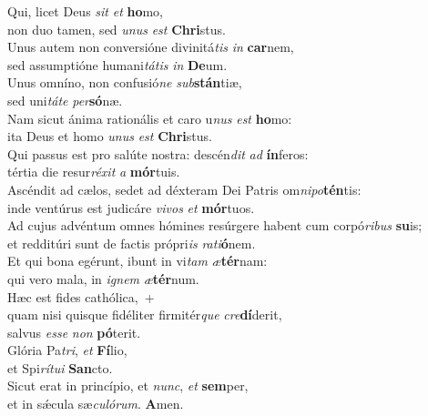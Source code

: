 \evenverse Qui, licet Deus \textit{sit} \textit{et} \textbf{ho}mo,~\*\\
\evenverse non duo tamen, sed \textit{u}\textit{nus} \textit{est} \textbf{Chri}stus.\\
\oddverse Unus autem non conversióne divinitá\textit{tis} \textit{in} \textbf{car}nem,~\*\\
\oddverse sed assumptióne humani\textit{tá}\textit{tis} \textit{in} \textbf{De}um.\\
\evenverse Unus omníno, non confusió\textit{ne} \textit{sub}\textbf{stán}tiæ,~\*\\
\evenverse sed uni\textit{tá}\textit{te} \textit{per}\textbf{só}næ.\\
\oddverse Nam sicut ánima rationális et caro u\textit{nus} \textit{est} \textbf{ho}mo:~\*\\
\oddverse ita Deus et homo \textit{u}\textit{nus} \textit{est} \textbf{Chri}stus.\\
\evenverse Qui passus est pro salúte nostra: descén\textit{dit} \textit{ad} \textbf{ín}feros:~\*\\
\evenverse tértia die resur\textit{ré}\textit{xit} \textit{a} \textbf{mór}tuis.\\
\oddverse Ascéndit ad cælos, sedet ad déxteram Dei Patris om\textit{ni}\textit{po}\textbf{tén}tis:~\*\\
\oddverse inde ventúrus est judicáre \textit{vi}\textit{vos} \textit{et} \textbf{mór}tuos.\\
\evenverse Ad cujus advéntum omnes hómines resúrgere habent cum corpó\textit{ri}\textit{bus} \textbf{su}is;~\*\\
\evenverse et redditúri sunt de factis própri\textit{is} \textit{ra}\textit{ti}\textbf{ó}nem.\\
\oddverse Et qui bona egérunt, ibunt in vi\textit{tam} \textit{æ}\textbf{tér}nam:~\*\\
\oddverse qui vero mala, in \textit{i}\textit{gnem} \textit{æ}\textbf{tér}num.\\
\evenverse Hæc est fides cathólica,~+\\
\evenverse  quam nisi quisque fidéliter firmitér\textit{que} \textit{cre}\textbf{dí}derit,~\*\\
\evenverse salvus \textit{es}\textit{se} \textit{non} \textbf{pó}terit.\\
\oddverse Glória Pa\textit{tri}, \textit{et} \textbf{Fí}lio,~\*\\
\oddverse et Spi\textit{rí}\textit{tu}\textit{i} \textbf{San}cto.\\
\evenverse Sicut erat in princípio, et \textit{nunc}, \textit{et} \textbf{sem}per,~\*\\
\evenverse et in sǽcula sæ\textit{cu}\textit{ló}\textit{rum}. \textbf{A}men.\\
